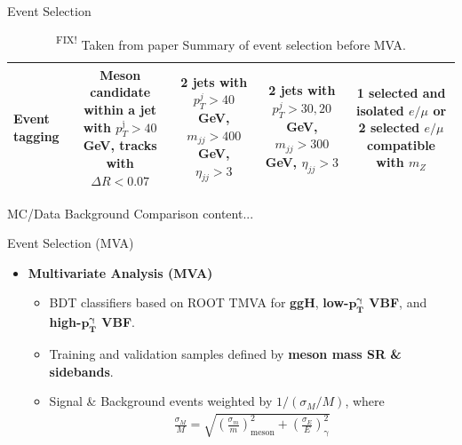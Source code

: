 \documentclass[9pt,aspectratio=1610]{beamer}
\newcommand{\khl}[1]{\textbf{\color{structure}#1}}
\newcommand{\ktodo}[1]{\colorbox{yellow!30}{{\color{red}\textsuperscript{\tiny FIX! }}#1}}
\begin{document}
\begin{frame}{Event Selection}
\begin{table}[!ht]
\begin{tabular}{|l|c|c|c|c|}
			\hline
			Event tagging & \multicolumn{1}{C{8em}}{Meson candidate within a jet with \(p_T^\mathrm{j} > 40\) GeV, tracks with \(\Delta R < 0.07\)} & \multicolumn{1}{C{8em}}{2 jets with \(p_T^{j} > 40\) GeV, \(m_{jj} > 400\) GeV, \(\eta_{jj} > 3\)} & \multicolumn{1}{C{8em}}{2 jets with \(p_T^{j} > 30, 20\) GeV, \(m_{jj} > 300\) GeV, \(\eta_{jj} > 3\)} & \multicolumn{1}{C{8em}|}{1 selected and isolated \(e/\mu\) or 2 selected \(e/\mu\) compatible with \(m_Z\)}\\
			\hline
		\end{tabular}
		\caption{\ktodo{Taken from paper} Summary of event selection before MVA.}
	\end{table}
\end{frame}

\begin{frame}{MC/Data Background Comparison}
	content...
\end{frame}

\begin{frame}{Event Selection (MVA)}
	\begin{itemize}
		\item \khl{Multivariate Analysis (MVA)}
		\vspace{1em}
		\begin{itemize}
			\item BDT classifiers based on ROOT TMVA \cite{hoecker2009tmva} for \textbf{ggH}, \textbf{low-\(\mathbf{p^\gamma_T}\) VBF}, and \textbf{high-\(\mathbf{p^\gamma_T}\) VBF}.
			\item Training and validation samples defined by \textbf{meson mass SR \& sidebands}.
			\item Signal \& Background events weighted by \(1/(\sigma_M/M)\), where
			\begin{align*}
				\frac{\sigma_M}{M} = \sqrt{\left(\frac{\sigma_m}{m}\right)^2_{\mathrm{meson}} + \left(\frac{\sigma _E}{E}\right)^2_{\mathrm{\gamma}}}
			\end{align*}
		\end{itemize}
	\end{itemize}
\end{frame}
\end{document}
